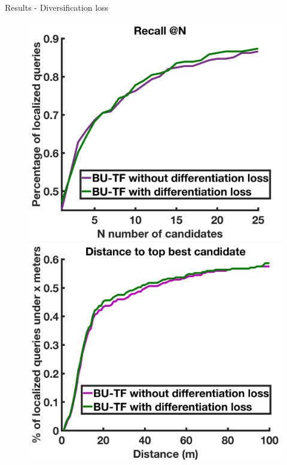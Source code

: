\begin{frame}{Results - Diversification loss}
	\begin{figure}[t]
		\centering %
		\includegraphics[width=0.499\linewidth]{images/diffloss_res/recall.jpg}\hfill
		\includegraphics[width=0.499\linewidth]{images/diffloss_res/dist.jpg}
	\end{figure}	
\end{frame}

